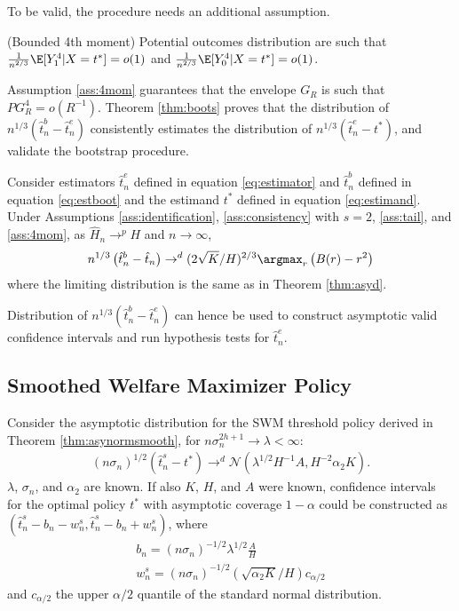 {To be valid, the procedure needs an additional assumption.
\begin{ass} \label{ass:4mom}
     {\normalfont (Bounded 4th moment)} Potential outcomes distribution are such that $\frac{1}{n^{2/3}}\E[Y_1^4|X=t^*] = o(1)$ and $\frac{1}{n^{2/3}}\E[Y_0^4|X=t^*] = o(1)$.
\end{ass}
Assumption \ref{ass:4mom} guarantees that the envelope $G_R$ is such that $PG_R^4 = o(R^{-1})$. Theorem \ref{thm:boots} proves that the distribution of $n^{1/3} \left(\hat{t}^b_n - \hat{t}^e_n\right)$ consistently estimates the distribution of $n^{1/3} \left(\hat{t}^e_n - t^* \right)$, and validate the bootstrap procedure.

\begin{thm} \label{thm:boots}
Consider estimators $\hat{t}^e_n$ defined in equation \eqref{eq:estimator} and $\hat{t}^b_n$ defined in equation \eqref{eq:estboot} and the estimand $t^*$ defined in equation \eqref{eq:estimand}. Under Assumptions \ref{ass:identification}, \ref{ass:consistency} with $s=2$, \ref{ass:tail}, and \ref{ass:4mom}, as $\hat{H}_n \rightarrow^p H$ and $n\rightarrow \infty$,
\begin{gather}
    n^{1 / 3}\left(\hat{t}^b_n - \hat{t}_n\right) \rightarrow^d (2\sqrt{K}/H)^{2/3}\argmax_r \left(B(r) - r^2 \right)
\end{gather}
where the limiting distribution is the same as in Theorem \ref{thm:asyd}.
\end{thm}

Distribution of $n^{1/3} \left(\hat{t}^b_n - \hat{t}^e_n\right)$ can hence be used to construct asymptotic valid confidence intervals and run hypothesis tests for $\hat{t}^e_n$. 


\subsection{Smoothed Welfare Maximizer Policy}

Consider the asymptotic distribution for the SWM threshold policy derived in Theorem \ref{thm:asynormsmooth}, for $n \sigma_n^{2h + 1} \rightarrow \lambda < \infty$:
\begin{gather}
    (n\sigma_n)^{1/2}(\hat{t}^s_n - t^*) \rightarrow^d \mathcal{N}(\lambda^{1/2}H^{-1}A, H^{-2}\alpha_2 K).
\end{gather}
$\lambda$, $\sigma_n$, and $\alpha_2$ are known. If also $K$, $H$, and $A$ were known, confidence intervals for the optimal policy $t^*$ with asymptotic coverage $1- \alpha$ could be constructed as $(\hat{t}^s_n - b_n - w^s_n, \hat{t}^s_n - b_n + w^s_n)$, where
\begin{gather}
    b_n = (n\sigma_n)^{-1/2} \lambda^{1/2} \frac{A}{H} \\
    w^s_n = (n\sigma_n)^{-1/2} (\sqrt{\alpha_2 K}/H)c_{\alpha/2}
\end{gather}
and $c_{\alpha/2}$ the upper $\alpha/2$ quantile of the standard normal distribution.

}
